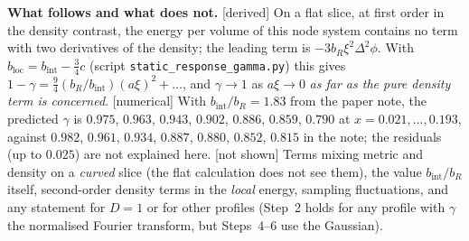 \smallskip\noindent\textbf{What follows and what does not.} [derived] On a flat slice, at first order in the density
contrast, the energy per volume of this node system contains no term with two derivatives of the density; the
leading term is $-3b_R\xi^2\Delta^2\phi$. With $b_{\mathrm{loc}}=b_{\mathrm{int}}-\tfrac34c$ (script
\texttt{static\_response\_gamma.py}) this gives $1-\gamma=\tfrac94(b_R/b_{\mathrm{int}})(a\xi)^2+\dots$, and $\gamma\to1$
as $a\xi\to0$ \emph{as far as the pure density term is concerned}. [numerical] With $b_{\mathrm{int}}/b_R=1.83$ from the
paper note, the predicted $\gamma$ is $0.975$, $0.963$, $0.943$, $0.902$, $0.886$, $0.859$, $0.790$ at
$x=0.021,\dots,0.193$, against $0.982$, $0.961$, $0.934$, $0.887$, $0.880$, $0.852$, $0.815$ in the note; the residuals
(up to $0.025$) are not explained here. [not shown] Terms mixing metric and density on a \emph{curved} slice (the flat
calculation does not see them), the value $b_{\mathrm{int}}/b_R$ itself, second-order density terms in the
\emph{local} energy, sampling fluctuations, and any statement for $D=1$ or for other profiles (Step~2 holds for any
profile with $\gamma$ the normalised Fourier transform, but Steps~4--6 use the Gaussian).
